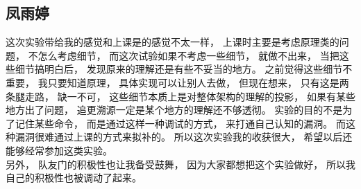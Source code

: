 \subsection{凤雨婷}
	这次实验带给我的感觉和上课是的感觉不太一样， 上课时主要是考虑原理类的问题， 不怎么考虑细节， 而这次试验如果不考虑一些细节， 就做不出来， 当把这些细节搞明白后， 发现原来的理解还是有些不妥当的地方。 之前觉得这些细节不重要， 我只要知道原理， 具体实现可以让别人去做， 但现在想来， 只有这是两条腿走路， 缺一不可， 这些细节本质上是对整体架构的理解的投影， 如果有某些地方出了问题， 追更溯源一定是某个地方的理解还不够透彻。 实验的目的不是为了记住某些命令， 而是通过这样一种调试的方式， 来打通自己认知的漏洞。 而这种漏洞很难通过上课的方式来拟补的。 所以这次实验我的收获很大， 希望以后还能够经常参加这类实验。\\
	\indent 另外， 队友门的积极性也让我备受鼓舞， 因为大家都想把这个实验做好， 所以我自己的积极性也被调动了起来。

